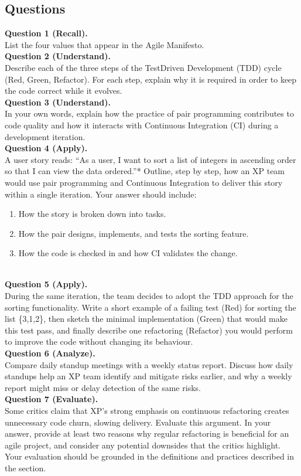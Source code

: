 \documentclass[12pt, a4paper]{article}
\begin{document}
\subsection{Questions}
\textbf{Question 1 (Recall).}\\
List the four values that appear in the Agile Manifesto.\\
\newpage
\textbf{Question 2 (Understand).}\\
Describe each of the three steps of the TestDriven Development (TDD) cycle (Red, Green, Refactor). For each step, explain why it is required in order to keep the code correct while it evolves.\\
\newpage
\textbf{Question 3 (Understand).}\\
In your own words, explain how the practice of pair programming contributes to code quality and how it interacts with Continuous Integration (CI) during a development iteration.\\
\newpage
\textbf{Question 4 (Apply).}\\
A user story reads: ``As a user, I want to sort a list of integers in ascending order so that I can view the data ordered.''*  
Outline, step by step, how an XP team would use pair programming and Continuous Integration to deliver this story within a single iteration. Your answer should include:
\begin{enumerate}
  \item How the story is broken down into tasks.
  \item How the pair designs, implements, and tests the sorting feature.
  \item How the code is checked in and how CI validates the change.
\end{enumerate}
\\
\newpage
\textbf{Question 5 (Apply).}\\
During the same iteration, the team decides to adopt the TDD approach for the sorting functionality.  
Write a short example of a failing test (Red) for sorting the list \{3,1,2\}, then sketch the minimal implementation (Green) that would make this test pass, and finally describe one refactoring (Refactor) you would perform to improve the code without changing its behaviour.\\
\newpage
\textbf{Question 6 (Analyze).}\\
Compare daily standup meetings with a weekly status report. Discuss how daily standups help an XP team identify and mitigate risks earlier, and why a weekly report might miss or delay detection of the same risks.\\
\newpage
\textbf{Question 7 (Evaluate).}\\
Some critics claim that XP's strong emphasis on continuous refactoring creates unnecessary code churn, slowing delivery. Evaluate this argument. In your answer, provide at least two reasons why regular refactoring is beneficial for an agile project, and consider any potential downsides that the critics highlight. Your evaluation should be grounded in the definitions and practices described in the section.\\
\newpage
\end{document}
